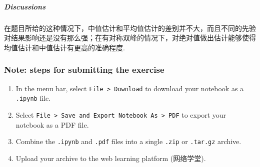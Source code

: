 \documentclass[11pt]{article}
\providecommand{\tightlist}{%
      \setlength{\itemsep}{0pt}\setlength{\parskip}{0pt}}
\begin{document}
    \subparagraph{Discussions}\label{discussions}

在题目所给的这种情况下，中值估计和平均值估计的差别并不大，而且不同的先验对结果影响还是没有那么强；在有对称双峰的情况下，对绝对值做出估计能够使得均值估计和中值估计有更高的准确程度.

    \subsubsection{Note: steps for submitting the
exercise}\label{note-steps-for-submitting-the-exercise}

\begin{enumerate}
\def\labelenumi{\arabic{enumi}.}
\tightlist
\item
  In the menu bar, select \texttt{File\ \textgreater{}\ Download} to
  download your notebook as a \texttt{.ipynb} file.
\item
  Select
  \texttt{File\ \textgreater{}\ Save\ and\ Export\ Notebook\ As\ \textgreater{}\ PDF}
  to export your notebook as a PDF file.
\item
  Combine the \texttt{.ipynb} and \texttt{.pdf} files into a single
  \texttt{.zip} or \texttt{.tar.gz} archive.
\item
  Upload your archive to the web learning platform (网络学堂).
\end{enumerate}


    
    
    
\end{document}
